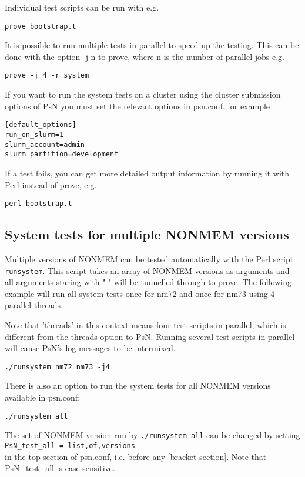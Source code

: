 Individual test scripts can be run with e.g.
\begin{verbatim}
prove bootstrap.t
\end{verbatim}

It is possible to run multiple tests in parallel to speed up the testing. This can be done with the option -j n to prove, where n is the number of parallel jobs e.g.
\begin{verbatim}
prove -j 4 -r system
\end{verbatim}

If you want to run the system tests on a cluster using the cluster submission options of PsN
you must set the relevant options in psn.conf, for example
\begin{verbatim}
[default_options]
run_on_slurm=1
slurm_account=admin
slurm_partition=development
\end{verbatim}

If a test fails, you can get more detailed output information by running it with Perl instead of prove, e.g.
\begin{verbatim}
perl bootstrap.t
\end{verbatim}

\subsection{System tests for multiple NONMEM versions}
Multiple versions of NONMEM can be tested automatically with the Perl script \verb|runsystem|. This script takes
an array of NONMEM versions as arguments and all arguments staring with "-" will be tunnelled through to prove.
The following example will run all system tests once for nm72 and once for nm73 using 4 parallel threads.

Note that 'threads' in this context means four test scripts in parallel, which is different from the
threads option to PsN. Running several test scripts in parallel will cause PsN's log messages to be intermixed.
\begin{verbatim}
./runsystem nm72 nm73 -j4
\end{verbatim}
There is also an option to run the system tests for all NONMEM versions available in psn.conf:
\begin{verbatim}
./runsystem all
\end{verbatim}
The set of NONMEM version run by \verb|./runsystem all| can be changed by setting\\
\verb|PsN_test_all = list,of,versions| \\
in the top section of psn.conf, i.e. before any [bracket section].
Note that PsN\_test\_all is case sensitive.


